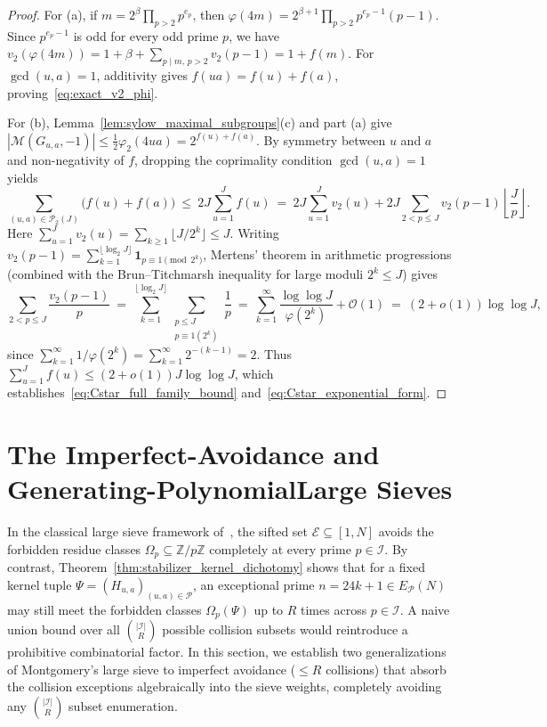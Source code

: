 \documentclass[11pt, a4paper]{article}
\theoremstyle{plain}
\theoremstyle{definition}
\newcommand{\Z}{\mathbb{Z}}
\begin{document}
\begin{proof}
For (a), if $m=2^{\beta}\prod_{p>2}p^{e_p}$, then $\varphi(4m)=2^{\beta+1}\prod_{p>2}p^{e_p-1}(p-1)$. Since $p^{e_p-1}$ is odd for every odd prime $p$, we have $v_2(\varphi(4m))=1+\beta+\sum_{p\mid m,\,p>2}v_2(p-1)=1+f(m)$. For $\gcd(u,a)=1$, additivity gives $f(ua)=f(u)+f(a)$, proving~\eqref{eq:exact_v2_phi}.

For (b), Lemma~\ref{lem:sylow_maximal_subgroups}(c) and part (a) give $|\mathcal{M}(G_{u,a},-1)|\le\frac12\varphi_2(4ua)=2^{f(u)+f(a)}$. By symmetry between $u$ and $a$ and non-negativity of $f$, dropping the coprimality condition $\gcd(u,a)=1$ yields
$$\sum_{(u,a)\in\mathcal{P}_2(J)}\big(f(u)+f(a)\big)\ \le\ 2J\sum_{u=1}^{J}f(u)\ =\ 2J\sum_{u=1}^{J}v_2(u)+2J\sum_{2<p\le J}v_2(p-1)\left\lfloor\frac{J}{p}\right\rfloor.$$
Here $\sum_{u=1}^{J}v_2(u)=\sum_{k\ge1}\lfloor J/2^{k}\rfloor\le J$. Writing $v_2(p-1)=\sum_{k=1}^{\lfloor\log_2 J\rfloor}\mathbf{1}_{p\equiv1\pmod{2^{k}}}$, Mertens' theorem in arithmetic progressions (combined with the Brun--Titchmarsh inequality for large moduli $2^{k}\le J$) gives
$$\sum_{2<p\le J}\frac{v_2(p-1)}{p}\ =\ \sum_{k=1}^{\lfloor\log_2 J\rfloor}\sum_{\substack{p\le J\\ p\equiv1(2^{k})}}\frac{1}{p}\ =\ \sum_{k=1}^{\infty}\frac{\log\log J}{\varphi(2^{k})}+\mathcal{O}(1)\ =\ (2+o(1))\log\log J,$$
since $\sum_{k=1}^{\infty}1/\varphi(2^{k})=\sum_{k=1}^{\infty}2^{-(k-1)}=2$. Thus $\sum_{u=1}^{J}f(u)\le(2+o(1))J\log\log J$, which establishes~\eqref{eq:Cstar_full_family_bound} and~\eqref{eq:Cstar_exponential_form}.
\end{proof}

\section[The Imperfect-Avoidance and Generating-Polynomial Large Sieves]{The Imperfect-Avoidance and Generating-Polynomial\linebreak Large Sieves}\label{sec:imperfect_large_sieve}

In the classical large sieve framework of~\cite[\S4.3]{dahan2026a}, the sifted set $\mathcal{E}\subseteq[1,N]$ avoids the forbidden residue classes $\Omega_p\subseteq\Z/p\Z$ completely at every prime $p\in\mathcal{I}$. By contrast, Theorem~\ref{thm:stabilizer_kernel_dichotomy} shows that for a fixed kernel tuple $\Psi=(H_{u,a})_{(u,a)\in\mathcal{P}}$, an exceptional prime $n=24k+1\in E_{\mathcal{P}}(N)$ may still meet the forbidden classes $\Omega_p(\Psi)$ up to $R$ times across $p\in\mathcal{I}$. A naive union bound over all $\binom{|\mathcal{I}|}{R}$ possible collision subsets would reintroduce a prohibitive combinatorial factor. In this section, we establish two generalizations of Montgomery's large sieve to imperfect avoidance ($\le R$ collisions) that absorb the collision exceptions algebraically into the sieve weights, completely avoiding any $\binom{|\mathcal{I}|}{R}$ subset enumeration.
\end{document}
